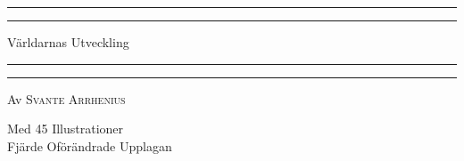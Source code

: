 \documentclass[a4paper, 12pt, oneside, swedish]{article}
\begin{document}
\begin{titlepage} %
	\centering %
	\scshape %

	
	\rule{\textwidth}{1.6pt}\vspace*{-\baselineskip}\vspace*{2pt} %
	\rule{\textwidth}{0.4pt} %
	
	\vspace{0.75\baselineskip} %

        {\LARGE Världarnas Utveckling \\} %
	
	\vspace{0.75\baselineskip} %
	
	\rule{\textwidth}{0.4pt}\vspace*{-\baselineskip}\vspace{3.2pt} %
	\rule{\textwidth}{1.6pt} %
	
	\vspace{1\baselineskip} %
	
	
	{Av \scshape\Large Svante Arrhenius \\} %
	
	\vspace*{1\baselineskip} %
	


	\vspace{1\baselineskip} %

        {\small Med 45 Illustrationer \\Fjärde Oförändrade Upplagan}

	

\end{titlepage}
\end{document}
